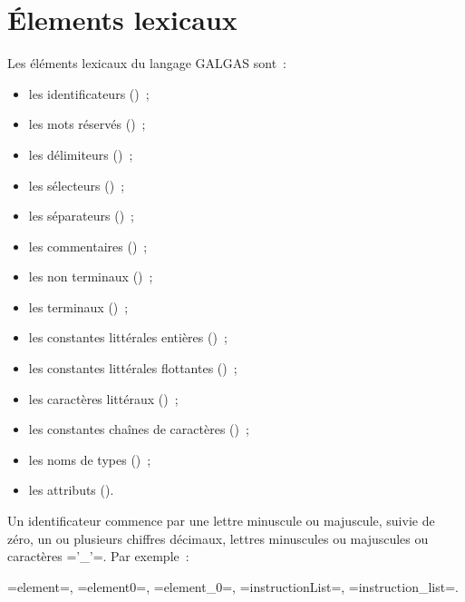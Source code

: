 
\chapter{Élements lexicaux}

Les éléments lexicaux du langage GALGAS sont~:
\begin{itemize}
  \item les identificateurs ()~;
  \item les mots réservés ()~;
  \item les délimiteurs ()~;
  \item les sélecteurs  ()~;
  \item les séparateurs  ()~;
  \item les commentaires  ()~;
  \item les non terminaux  ()~;
  \item les terminaux ()~;
  \item les constantes littérales entières ()~;
  \item les constantes littérales flottantes ()~;
  \item les caractères littéraux ()~;
  \item les constantes chaînes de caractères ()~;
  \item les noms de types ()~;
  \item les attributs ().
\end{itemize}



Un identificateur commence par une lettre minuscule ou majuscule, suivie de zéro, un ou plusieurs chiffres décimaux, lettres minuscules ou majuscules ou caractères \ggs='_'=. Par exemple~:

\ggs=element=, \ggs=element0=, \ggs=element_0=, \ggs=instructionList=, \ggs=instruction_list=.

